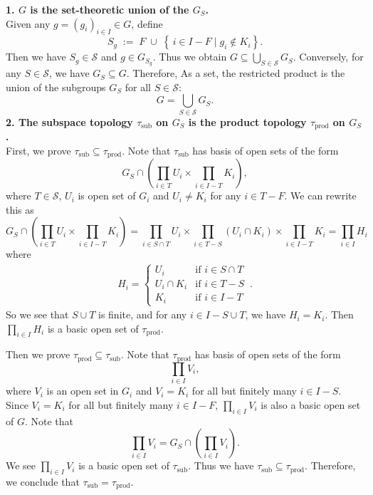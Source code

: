 \documentclass{report}
\begin{document}
\begin{prf}
	\noindent\textbf{1. $G$ is the set-theoretic union of the $G_S$.} \\
	Given any $g=(g_i)_{i\in I}\in G$, define
	\[
	S_g\;:=\;F\;\cup\;\left\{\,i\in I- F \mid g_i\notin K_i\right\}.
	\]
	Then we have $S_g \in \mathcal{S}$ and $g\in G_{S_g}$. Thus we obtain $G\subseteq \bigcup_{S\in \mathcal S} G_S$. Conversely, for any $S\in \mathcal{S}$, we have $G_S\subseteq G$. Therefore,
	As a set, the restricted product is the union of the subgroups \( G_S \) for all \( S \in \mathcal{S} \):
	\[
	   G=\bigcup_{S\in \mathcal S} G_S .
	\]
	\smallskip
	\noindent\textbf{2. The subspace topology $\tau_{\mathrm{sub}}$ on $G_S$ is the product topology $\tau_{\mathrm{prod}}$ on $G_S$.}\\
	First, we prove $\tau_{\mathrm{sub}} \subseteq \tau_{\mathrm{prod}}$. Note that $\tau_{\mathrm{sub}}$ has basis of open sets of the form
	\[	
	G_S\cap \left(\prod_{i\in T} U_i \times \prod_{i\in I-T} K_i\right),
	\]
    where $T\in\mathcal S$, $U_i$ is open set of $G_i$ and $U_i\ne K_i$ for any $i\in T-F$. We can rewrite this as
	\[
	G_S\cap \left(\prod_{i\in T} U_i \times \prod_{i\in I-T} K_i\right)=\prod_{i\in S\cap T} U_i\times \prod_{i\in T - S} (U_i\cap K_i)\times \prod_{i\in I- T} K_i=\prod_{i\in I} H_i
	\]
	where
	\begin{align*}
		H_i=\begin{cases}
			U_i & \text{if } i\in S\cap T\\
			U_i\cap K_i & \text{if } i\in T-S\\
			K_i & \text{if } i\in I-T
		\end{cases}\,.
	\end{align*}
	So we see that $S\cup T$ is finite, and for any $i\in I-S\cup T$, we have $H_i = K_i$. Then $\prod_{i\in I} H_i$ is a basic open set of  $\tau_{\mathrm{prod}}$.

	Then we prove $\tau_{\mathrm{prod}} \subseteq \tau_{\mathrm{sub}}$. Note that $\tau_{\mathrm{prod}}$ has basis of open sets of the form
	\[
	\prod_{i\in I} V_i,
	\]
	where $V_i$ is an open set in $G_i$ and $V_i = K_i$ for all but finitely many $i \in I-S$. Since $V_i = K_i$ for all but finitely many $i \in I-F$, $\prod_{i\in I} V_i$ is also a basic open set of $G$. Note that 
	\[
	\prod_{i\in I} V_i=G_S\cap\left(\prod_{i\in I} V_i\right).
	\]
    We see $\prod_{i\in I} V_i$ is a basic open set of $\tau_{\mathrm{sub}}$. Thus we have $\tau_{\mathrm{sub}} \subseteq \tau_{\mathrm{prod}}$. Therefore, we conclude that $\tau_{\mathrm{sub}} = \tau_{\mathrm{prod}}$.
	

\end{prf}
\end{document}
